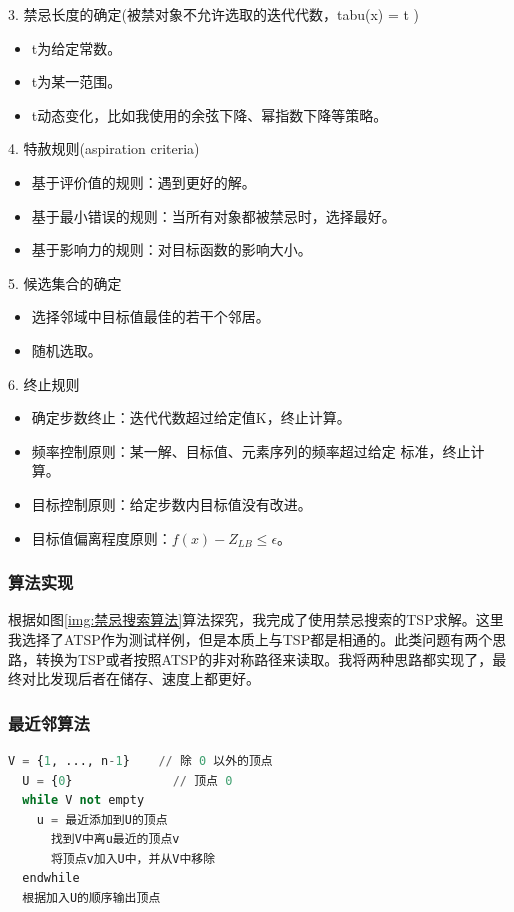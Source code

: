 \documentclass[lang=cn,11pt]{elegantpaper}
\begin{document}
3. 禁忌长度的确定(被禁对象不允许选取的迭代代数，tabu(x) = t )
        \begin{itemize}[leftmargin=50pt]
        \item t为给定常数。
        \item t为某一范围。
        \item t动态变化，比如我使用的余弦下降、幂指数下降等策略。
        \end{itemize}
        
4. 特赦规则(aspiration criteria)
        \begin{itemize}[leftmargin=50pt]
        \item 基于评价值的规则：遇到更好的解。
        \item 基于最小错误的规则：当所有对象都被禁忌时，选择最好。
        \item 基于影响力的规则：对目标函数的影响大小。
        \end{itemize}
        
5. 候选集合的确定
        \begin{itemize}[leftmargin=50pt]
        \item 选择邻域中目标值最佳的若干个邻居。
        \item 随机选取。
        \end{itemize}
        
6. 终止规则
        \begin{itemize}[leftmargin=50pt]
        \item 确定步数终止：迭代代数超过给定值K，终止计算。
        \item 频率控制原则：某一解、目标值、元素序列的频率超过给定                                   标准，终止计算。
        \item 目标控制原则：给定步数内目标值没有改进。
        \item 目标值偏离程度原则：$f(x) - Z_{LB} \leq \epsilon$。
        \end{itemize}

\subsubsection{算法实现}
根据如图\ref{img:禁忌搜索算法}算法探究，我完成了使用禁忌搜索的TSP求解。这里我选择了ATSP作为测试样例，但是本质上与TSP都是相通的。此类问题有两个思路，转换为TSP或者按照ATSP的非对称路径来读取。我将两种思路都实现了，最终对比发现后者在储存、速度上都更好。


\subsubsection{最近邻算法}
\begin{lstlisting}[language=python]
  V = {1, ..., n-1}    // 除 0 以外的顶点
  U = {0}              // 顶点 0
  while V not empty
    u = 最近添加到U的顶点
      找到V中离u最近的顶点v
      将顶点v加入U中，并从V中移除
  endwhile
  根据加入U的顺序输出顶点
\end{lstlisting}
\end{document}
